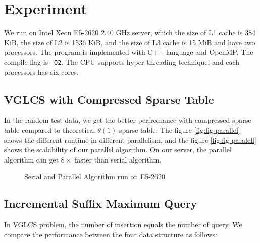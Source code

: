 \section{Experiment}
\label{sec:Experiment}

We run on Intel Xeon E5-2620 2.40 GHz server, which the size of L1
cache is 384 KiB, the size of L2 is 1536 KiB, and the size of L3 cache
is 15 MiB and have two processors.  The program is implemented with
C++ language and OpenMP. The compile flag is \texttt{-O2}.  The CPU
supports hyper threading technique, and each processors has six cores.

\subsection{VGLCS with Compressed Sparse Table}

In the random test data, we get the better perfromance with compressed
sparse table compared to theoretical $\theta(1)$ sparse table.  The
figure \ref{fig:fig-parallel} shows the different runtime in different
parallelism, and the figure \ref{fig:fig-paralell} shows the
scalability of our parallel algorithm.  On our server, the parallel
algorithm can get $8 \times$ faster than serial algorithm.

\begin{figure*}[!thb]
  \centering
  \caption{Serial and Parallel Algorithm run on E5-2620}
\end{figure*}



\subsection{Incremental Suffix Maximum Query}

In VGLCS problem, the number of insertion equals the number of query.
We compare the performance between the four data structure as follows:

